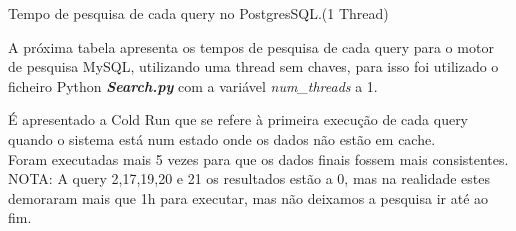 \documentclass{article}
\begin{document}
\begin{table}[H]
    \caption{Tempo de pesquisa de cada query no PostgresSQL.(1 Thread)}
    \label{tab:BC_Table3}
  \end{table}
\clearpage

\texttt{}\par A próxima tabela apresenta os tempos de pesquisa de cada query para o motor de pesquisa MySQL, utilizando uma thread sem chaves, para isso foi utilizado o ficheiro Python \textbf{\textit{Search.py}}  com a variável \textit{num\_threads} a 1. 
\texttt{}\par É apresentado a Cold Run que se refere à primeira execução de cada query quando o sistema está num estado onde os dados não estão em cache.\\
Foram executadas mais 5 vezes para que os dados finais fossem mais consistentes.\\
NOTA: A query 2,17,19,20 e 21 os resultados estão a 0, mas na realidade estes demoraram mais que 1h para executar, mas não deixamos a pesquisa ir até ao fim.
\end{document}
